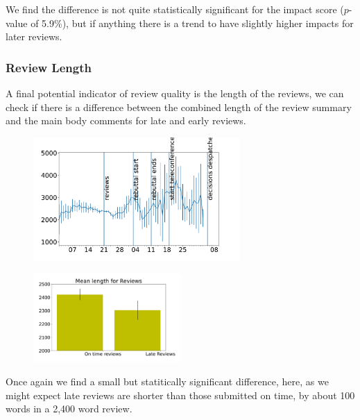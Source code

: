 We find the difference is not quite statistically significant for the
impact score (\(p\)-value of 5.9\%), but if anything there is a trend to
have slightly higher impacts for later reviews.

\hypertarget{review-length}{%
\subsubsection{Review Length}\label{review-length}}

A final potential indicator of review quality is the length of the
reviews, we can check if there is a difference between the combined
length of the review summary and the main body comments for late and
early reviews.

\begin{figure}[htb]
\includegraphics[width=0.70\textwidth]{diagrams/neurips/review-length-time.pdf}


\caption{}
\label{review-length-time}
\end{figure}

\begin{figure}[htb]
\includegraphics[width=0.50\textwidth]{diagrams/neurips/review-length-early-late.pdf}


\caption{}
\label{review-length-early-late}
\end{figure}

Once again we find a small but statitically significant difference,
here, as we might expect late reviews are shorter than those submitted
on time, by about 100 words in a 2,400 word review.

